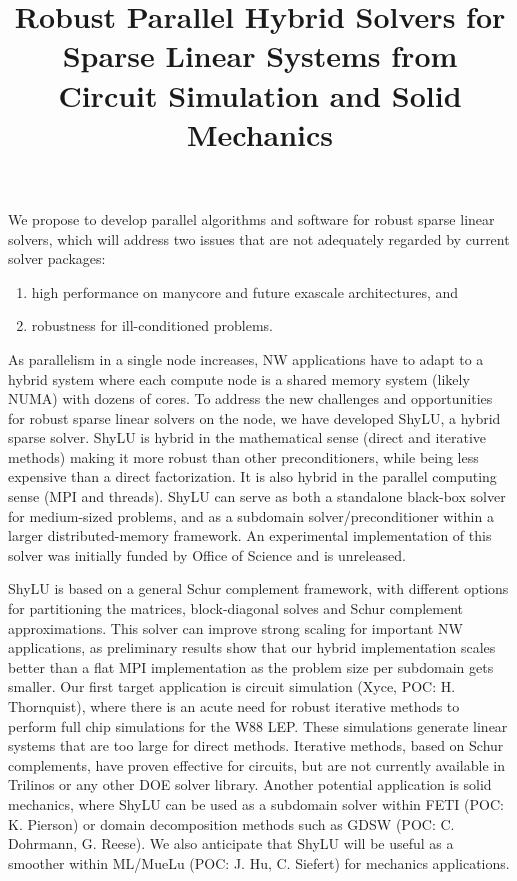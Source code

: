 \documentclass[10pt]{amsart}
\date{}
\title{Robust Parallel Hybrid Solvers for Sparse Linear Systems
from Circuit Simulation and Solid Mechanics}
\begin{document}
\maketitle

\vspace{-4mm}
We propose to develop parallel algorithms and software for robust sparse linear solvers,
which will address two issues that are not adequately regarded by current solver packages:
\begin{enumerate}
\item high performance on manycore and future exascale architectures, and
\item robustness for ill-conditioned problems.
\end{enumerate}

As parallelism in a single node increases, NW applications
have to adapt to a hybrid system where each compute node 
is a shared memory system (likely NUMA) with dozens of cores. 
To address the new challenges and opportunities 
for robust sparse linear solvers on the node,
we have developed ShyLU, a hybrid sparse solver. 
ShyLU is hybrid in the
mathematical sense (direct and iterative methods) making it more
robust than other preconditioners, while being less expensive
than a direct factorization.  It is also hybrid in the parallel
computing sense (MPI and threads).  ShyLU can serve as both
a standalone black-box solver for medium-sized problems,
and as a subdomain solver/preconditioner within a larger 
distributed-memory framework. 
An experimental implementation of
this solver was initially funded by Office of Science and is unreleased. 

ShyLU is based on a general Schur complement framework, with different options
for partitioning the matrices, block-diagonal solves and Schur complement
approximations.  This solver can improve strong scaling for important NW 
applications, as preliminary results show that our hybrid implementation scales better than
a flat MPI implementation as the problem size per subdomain gets smaller.
Our first target application is circuit simulation (Xyce, POC: H. Thornquist), 
where there is an acute need for robust iterative methods to perform full chip 
simulations for the W88 LEP. These simulations generate linear systems that 
are too large for direct methods.
Iterative methods, based on Schur complements, have proven effective for circuits, but
are not currently available in Trilinos or any other DOE solver library.
%
Another potential application is solid mechanics, where ShyLU
can be used as a subdomain solver within FETI (POC: K. Pierson) or
domain decomposition methods such as GDSW (POC: C. Dohrmann, G. Reese). 
We also anticipate that ShyLU will be useful as a smoother within 
ML/MueLu (POC: J. Hu, C. Siefert) for mechanics applications.
%
\end{document}
